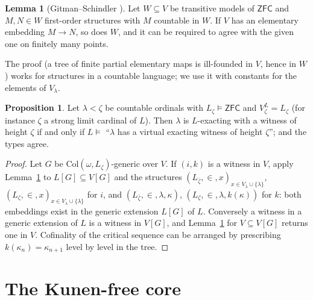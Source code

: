 \documentclass[11pt,letterpaper]{article}
\theoremstyle{definition}
\newtheorem{proposition}[definition]{Proposition}
\newtheorem{lemma}[definition]{Lemma}
\numberwithin{equation}{section}
\newcommand{\ZFC}{\mathsf{ZFC}}
\begin{document}
\begin{lemma}[Gitman--Schindler {\cite[Lemma~3.1]{gs}}]\label{lem:abs}
Let $W\subseteq V$ be transitive models of $\ZFC$ and $M,N\in W$ first-order structures with $M$ countable in $W$. If $V$ has an elementary embedding $M\to N$, so does $W$, and it can be required to agree with the given one on finitely many points.
\end{lemma}

The proof (a tree of finite partial elementary maps is ill-founded in $V$, hence in $W$) works for structures in a countable language; we use it with constants for the elements of $V_\lambda$.

\begin{proposition}\label{prop:equiv}
Let $\lambda<\zeta$ be countable ordinals with $L_\zeta\models\ZFC$ and $V^L_\zeta=L_\zeta$ (for instance $\zeta$ a strong limit cardinal of $L$). Then $\lambda$ is $L$-exacting with a witness of height $\zeta$ if and only if $L\models$ ``$\lambda$ has a virtual exacting witness of height $\zeta$''; and the types agree.
\end{proposition}

\begin{proof}
Let $G$ be $\mathrm{Col}(\omega,L_\zeta)$-generic over $V$. If $(i,k)$ is a witness in $V$, apply Lemma~\ref{lem:abs} to $L[G]\subseteq V[G]$ and the structures $(L_{\bar\zeta},\in,x)_{x\in V_\lambda\cup\{\lambda\}}$, $(L_\zeta,\in,x)_{x\in V_\lambda\cup\{\lambda\}}$ for $i$, and $(L_{\bar\zeta},\in,\lambda,\kappa)$, $(L_\zeta,\in,\lambda,k(\kappa))$ for $k$: both embeddings exist in the generic extension $L[G]$ of $L$. Conversely a witness in a generic extension of $L$ is a witness in $V[G]$, and Lemma~\ref{lem:abs} for $V\subseteq V[G]$ returns one in $V$. Cofinality of the critical sequence can be arranged by prescribing $k(\kappa_n)=\kappa_{n+1}$ level by level in the tree.
\end{proof}

\section{The Kunen-free core}\label{sec:free}
\end{document}
